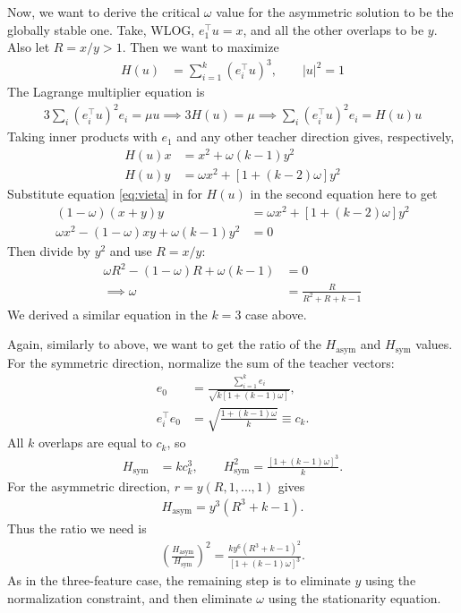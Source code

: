 \documentclass[11pt, reqno]{amsart}
\theoremstyle{notestyle}
\theoremstyle{defstyle}
\begin{document}
Now, we want to derive the critical $\omega$ value for the asymmetric solution to be the globally stable one.
Take, WLOG, $e_1^\top u = x$, and all the other overlaps to be $y$.
Also let $R = x/y > 1$.
Then we want to maximize
\begin{align*}
    H(u)
    &= \sum_{i=1}^k (e_i^\top u)^3,
    \qquad |u|^2 = 1
\end{align*}
The Lagrange multiplier equation is
\begin{align*}
    3 \sum_i (e_i^\top u)^2 e_i
    = \mu u
    \implies
    3 H(u) = \mu
    \implies \sum_i (e_i^\top u)^2 e_i = H(u)u
\end{align*}
Taking inner products with $e_1$ and any other teacher direction gives, respectively,
\begin{align*}
    H(u) x
    &= x^2 + \omega(k-1)y^2 \\
    H(u) y
    &= \omega x^2 + [1 + (k-2)\omega]y^2
\end{align*}
Substitute equation \ref{eq:vieta} in for $H(u)$ in the second equation here to get
\begin{align*}
    (1-\omega)(x+y)y
    &= \omega x^2 + [1 + (k-2)\omega]y^2 \\
    \omega x^2 - (1-\omega)xy + \omega(k-1)y^2 &= 0
\end{align*}
Then divide by $y^2$ and use $R = x/y$:
\begin{align}\label{eq:k-feature-stationarity}
    \omega R^2 - (1-\omega)R + \omega(k-1) &= 0 \\
    \implies
    \omega
    &= \frac{R}{R^2 + R + k-1}
\end{align}
We derived a similar equation in the $k=3$ case above.

Again, similarly to above, we want to get the ratio of the $H_\text{asym}$ and $H_\text{sym}$ values.
For the symmetric direction, normalize the sum of the teacher vectors:
\begin{align*}
    e_0
    &= \frac{\sum_{i=1}^k e_i}{\sqrt{k[1+(k-1)\omega]}}, \\
    e_i^\top e_0
    &= \sqrt{\frac{1+(k-1)\omega}{k}}
    \equiv c_k.
\end{align*}
All $k$ overlaps are equal to $c_k$, so
\begin{align*}
    H_\text{sym} &= kc_k^3,
    \qquad H_\text{sym}^2=\frac{[1+(k-1)\omega]^3}{k}.
\end{align*}
For the asymmetric direction, $r=y(R,1,\ldots,1)$ gives
\begin{align*}
    H_\text{asym}=y^3(R^3+k-1).
\end{align*}
Thus the ratio we need is
\begin{align*}
    \left(\frac{H_\text{asym}}{H_\text{sym}}\right)^2
    =\frac{k y^6(R^3+k-1)^2}{[1+(k-1)\omega]^3}.
\end{align*}
As in the three-feature case, the remaining step is to eliminate $y$ using the normalization constraint, and then eliminate $\omega$ using the stationarity equation.
\end{document}

